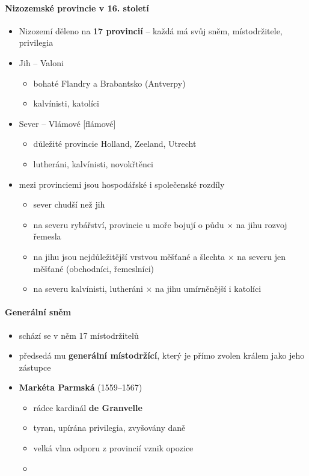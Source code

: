 \paragraph{Nizozemské provincie v 16. století}
\begin{itemize}
\item Nizozemí děleno na \textbf{17 provincií} -- každá má svůj sněm, místodržitele, privilegia
\item Jih -- Valoni
 	\begin{itemize}
	\item bohaté Flandry a Brabantsko (Antverpy)
	\item kalvínisti, katolíci
 	\end{itemize}
\item Sever -- Vlámové [flámové]
	\begin{itemize}
	\item důležité provincie Holland, Zeeland, Utrecht
	\item lutheráni, kalvínisti, novokřtěnci
	\end{itemize}
\item mezi provinciemi jsou hospodářské i společenské rozdíly
	\begin{itemize}
	\item sever chudší než jih
	\item na severu rybářství, provincie u moře bojují o půdu $\times$ na jihu rozvoj řemesla
	\item na jihu jsou nejdůležitější vrstvou měšťané a šlechta $\times$ na severu jen měšťané (obchodníci, řemeslníci)
	\item na severu kalvínisti, lutheráni $\times$ na jihu umírněnější i katolíci
	\end{itemize}
\end{itemize}

\paragraph{Generální sněm}
\begin{itemize}
\item schází se v něm 17 místodržitelů
\item předsedá mu \textbf{generální místodržící}, který je přímo zvolen králem jako jeho zástupce
\item \textbf{Markéta Parmská} (1559--1567)
	\begin{itemize}
	\item rádce kardinál \textbf{de Granvelle}
	\item tyran, upírána privilegia, zvyšovány daně
	\item velká vlna odporu z provincií \ra vznik opozice
	\item {}
	\end{itemize}
\end{itemize}

